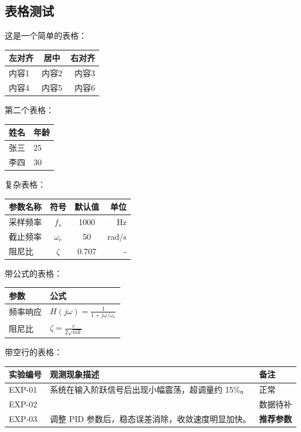 \documentclass{ctexart}
\begin{document}
\subsection{表格测试}

这是一个简单的表格：


\begin{table}[H]
\centering
\begin{tabular}{lcr}
\toprule
左对齐 & 居中 & 右对齐 \\
\midrule
内容1 & 内容2 & 内容3 \\
内容4 & 内容5 & 内容6 \\
\bottomrule
\end{tabular}
\end{table}

第二个表格：


\begin{table}[H]
\centering
\begin{tabular}{ll}
\toprule
姓名 & 年龄 \\
\midrule
张三 & 25 \\
李四 & 30 \\
\bottomrule
\end{tabular}
\end{table}

复杂表格：


\begin{table}[H]
\centering
\begin{tabular}{lccr}
\toprule
参数名称 & 符号 & 默认值 & 单位 \\
\midrule
采样频率 & $f_s$ & 1000 & Hz \\
截止频率 & $\omega_c$ & 50 & rad/s \\
阻尼比 & $\zeta$ & 0.707 & - \\
\bottomrule
\end{tabular}
\end{table}

带公式的表格：


\begin{table}[H]
\centering
\begin{tabular}{ll}
\toprule
参数 & 公式 \\
\midrule
频率响应 & $H(j\omega) = \frac{1}{1 + j\omega/\omega_c}$ \\
阻尼比 & $\zeta = \frac{c}{2\sqrt{mk}}$ \\
\bottomrule
\end{tabular}
\end{table}

带空行的表格：


\begin{table}[H]
\centering
\begin{tabular}{lll}
\toprule
实验编号 & 观测现象描述 & 备注 \\
\midrule
EXP-01 & 系统在输入阶跃信号后出现小幅震荡，超调量约 15\%。 & 正常 \\
EXP-02 &  & 数据待补 \\
EXP-03 & 调整 PID 参数后，稳态误差消除，收敛速度明显加快。 & \textbf{推荐参数} \\
\bottomrule
\end{tabular}
\end{table}
\end{document}
